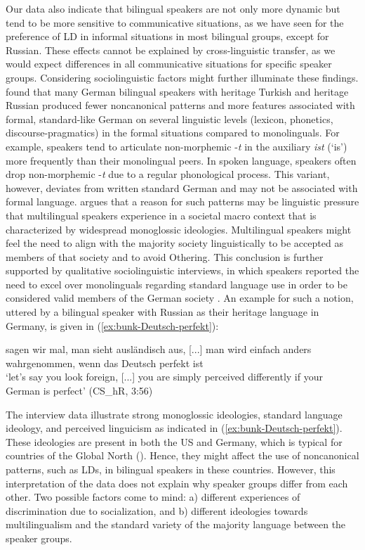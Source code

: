 \documentclass[output=paper,colorlinks,citecolor=brown]{langscibook}
\begin{document}
Our data also indicate that bilingual speakers are not only more dynamic but tend to be more sensitive to communicative situations, as we have seen for the preference of LD in informal situations in most bilingual groups, except for Russian. These effects cannot be explained by cross-linguistic transfer, as we would expect differences in all communicative situations for specific speaker groups. Considering sociolinguistic factors might further illuminate these findings. \citet{bunk_what_nodate} found that many German bilingual speakers with heritage Turkish and heritage Russian produced fewer noncanonical patterns and more features associated with formal, standard-like German on several linguistic levels (lexicon, phonetics, discourse-pragmatics) in the formal situations compared to monolinguals. For example, speakers tend to articulate non-morphemic -\textit{t} in the auxiliary \textit{ist} (‘is') more frequently than their monolingual peers. In spoken language, speakers often drop non-morphemic -\textit{t} due to a regular phonological process. This variant, however, deviates from written standard German and may not be associated with formal language. \citet{bunk_what_nodate, bunk_anxious_nodate} argues that a reason for such patterns may be linguistic pressure that multilingual speakers experience in a societal macro context that is characterized by widespread monoglossic ideologies. Multilingual speakers might feel the need to align with the majority society linguistically to be accepted as members of that society and to avoid Othering. This conclusion is further supported by qualitative sociolinguistic interviews, in which speakers reported the need to excel over monolinguals regarding standard language use in order to be considered valid members of the German society \citet{bunk_what_nodate, bunk_anxious_nodate}. An example for such a notion, uttered by a bilingual speaker with Russian as their heritage language in Germany,  is given in (\ref{ex:bunk-Deutsch-perfekt}):   

\begin{exe}
    \ex \label{ex:bunk-Deutsch-perfekt}
    sagen wir mal, man sieht ausländisch aus, [...] man wird einfach anders wahrgenommen, wenn das Deutsch perfekt ist \\
‘let's say you look foreign, [...] you are simply perceived differently if your German is perfect’ (CS\_hR, 3:56) 
\end{exe}

The interview data illustrate strong monoglossic ideologies, standard language ideology, and perceived linguicism as indicated in (\ref{ex:bunk-Deutsch-perfekt}). These ideologies are present in both the US and Germany, which is typical for countries of the Global North (\cite{Lippi-Green1997, Blackledge_2000}). Hence, they might affect the use of noncanonical patterns, such as LDs, in bilingual speakers in these countries. However, this interpretation of the data does not explain why speaker groups differ from each other. Two possible factors come to mind: a) different experiences of discrimination due to socialization, and b) different ideologies towards multilingualism and the standard variety of the majority language between the speaker groups.
\end{document}
